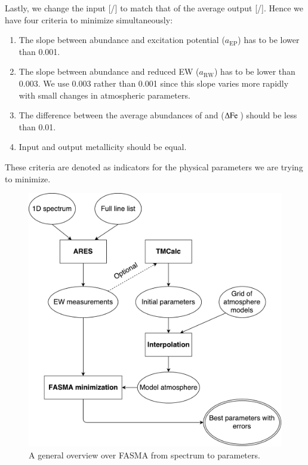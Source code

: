 \documentclass{aa}
\begin{document}
Lastly, we change the input [/] to match
that of the average output [/]. Hence we have four criteria to
minimize simultaneously:

\begin{enumerate}
    \item The slope between abundance and excitation potential ($a_\mathrm{EP}$)
          has to be lower than 0.001.
    \item The slope between abundance and reduced EW ($a_\mathrm{RW}$) has to be
          lower than 0.003. We use 0.003 rather than 0.001 since this slope
          varies more rapidly with small changes in atmospheric parameters.
    \item The difference between the average abundances of  and
           ($\Delta\ion{Fe}{}$) should be less than 0.01.
    \item Input and output metallicity should be equal.
\end{enumerate}
These criteria are denoted as indicators for the physical parameters we
are trying to minimize.

\begin{figure}[tpb]
    \centering
    \includegraphics[width=1.0\linewidth,natwidth=700,natheight=650]{figures/FASMA_general.pdf}
    \caption{A general overview over FASMA from spectrum to parameters.}
    \label{fig:FASMA_general}
\end{figure}
\end{document}
